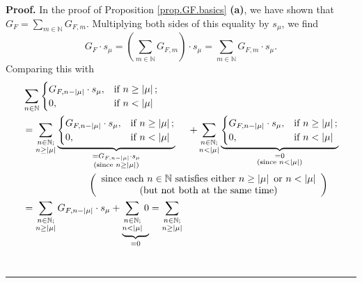 \documentclass[numbers=enddot,12pt,final,onecolumn,notitlepage]{scrartcl}%
\theoremstyle{definition}
\newenvironment{proof}[1][Proof]{\noindent\textbf{#1.} }{\ \rule{0.5em}{0.5em}}
\let\sumnonlimits\sum
\renewcommand{\sum}{\sumnonlimits\limits}
\newenvironment{verlong}{}{}
\begin{document}
\begin{verlong}
\begin{proof}
In the proof of Proposition \ref{prop.GF.basics} \textbf{(a)}, we have shown
that $G_{F}=\sum_{m\in\mathbb{N}}G_{F,m}$. Multiplying both sides of this
equality by $s_{\mu}$, we find%
\[
G_{F}\cdot s_{\mu}=\left(  \sum_{m\in\mathbb{N}}G_{F,m}\right)  \cdot s_{\mu
}=\sum_{m\in\mathbb{N}}G_{F,m}\cdot s_{\mu}.
\]
Comparing this with%
\begin{align*}
&  \sum_{n\in\mathbb{N}}%
\begin{cases}
G_{F,n-\left\vert \mu\right\vert }\cdot s_{\mu}, & \text{if }n\geq\left\vert
\mu\right\vert ;\\
0, & \text{if }n<\left\vert \mu\right\vert
\end{cases}
\\
&  =\sum_{\substack{n\in\mathbb{N};\\n\geq\left\vert \mu\right\vert
}}\underbrace{%
\begin{cases}
G_{F,n-\left\vert \mu\right\vert }\cdot s_{\mu}, & \text{if }n\geq\left\vert
\mu\right\vert ;\\
0, & \text{if }n<\left\vert \mu\right\vert
\end{cases}
}_{\substack{=G_{F,n-\left\vert \mu\right\vert }\cdot s_{\mu}\\\text{(since
}n\geq\left\vert \mu\right\vert \text{)}}}\ \ \ \ +\sum_{\substack{n\in
\mathbb{N};\\n<\left\vert \mu\right\vert }}\underbrace{%
\begin{cases}
G_{F,n-\left\vert \mu\right\vert }\cdot s_{\mu}, & \text{if }n\geq\left\vert
\mu\right\vert ;\\
0, & \text{if }n<\left\vert \mu\right\vert
\end{cases}
}_{\substack{=0\\\text{(since }n<\left\vert \mu\right\vert \text{)}}}\\
&  \ \ \ \ \ \ \ \ \ \ \ \ \ \ \ \ \ \ \ \ \left(
\begin{array}
[c]{c}%
\text{since each }n\in\mathbb{N}\text{ satisfies either }n\geq\left\vert
\mu\right\vert \text{ or }n<\left\vert \mu\right\vert \\
\text{(but not both at the same time)}%
\end{array}
\right) \\
&  =\sum_{\substack{n\in\mathbb{N};\\n\geq\left\vert \mu\right\vert
}}G_{F,n-\left\vert \mu\right\vert }\cdot s_{\mu}+\underbrace{\sum
_{\substack{n\in\mathbb{N};\\n<\left\vert \mu\right\vert }}0}_{=0}%
=\sum_{\substack{n\in\mathbb{N};\\n\geq\left\vert \mu\right\vert
}}
\end{align*}
\end{proof}
\end{verlong}
\end{document}
